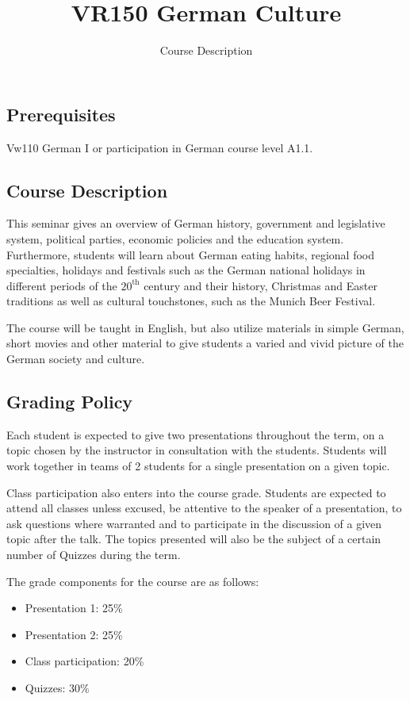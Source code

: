 \documentclass[12pt]{article}
\title{VR150 German Culture}
\subtitle{Course Description}
\begin{document}

\maketitle

\subsection*{Prerequisites}
Vw110 German I or participation in German course level A1.1. 
\subsection*{Course Description}
This seminar gives an overview of German history, government and legislative system, political parties, economic policies and the education system. Furthermore, students will learn about German eating habits, regional food specialties, holidays and festivals such as the German national holidays in different periods of the $20^{\text{th}}$ century and their history, Christmas and Easter traditions as well as cultural touchstones, such as the Munich Beer Festival.

The course will be taught in English, but also utilize materials in simple German, short movies and other material to give students a varied and vivid picture of the German society and culture.
\subsection*{Grading Policy}
Each student is expected to give two presentations throughout the term, on a topic chosen by the instructor in consultation with the students.  Students will work together in teams of 2 students for a single presentation on a given topic. 

Class participation also enters into the course grade. Students are expected to attend all classes unless excused, be attentive to the speaker of a presentation, to ask questions where warranted and to participate in the discussion of a given topic after the talk. 
The topics presented will also be the subject of a certain number of Quizzes during the term. 

The grade components for the course are as follows:
\begin{itemize}
    \item Presentation 1: 25\%
    \item Presentation 2: 25\%
    \item Class participation: 20\%
    \item Quizzes: 30\%
\end{itemize}
\end{document}
